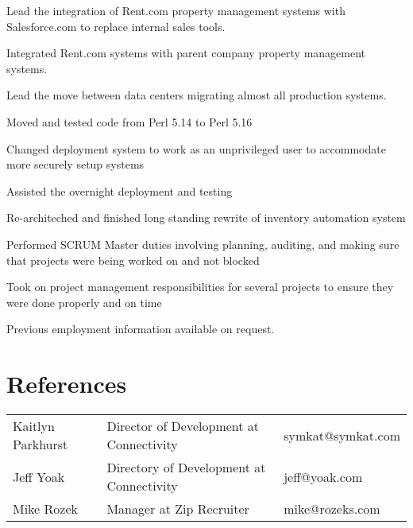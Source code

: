 \documentclass[table,tmargin=1in,bmargin=1in,letterpaper]{resume}
\begin{document}
\begin{compactitem}
\item Lead the integration of Rent.com property management systems with Salesforce.com to replace internal sales tools.
\item Integrated Rent.com systems with parent company property management systems.
\item Lead the move between data centers migrating almost all production systems.
  \begin{compactitem}
  \item Moved and tested code from Perl 5.14 to Perl 5.16
  \item Changed deployment system to work as an unprivileged user to accommodate more securely setup systems
  \item Assisted the overnight deployment and testing
  \end{compactitem}
\item Re-architeched and finished long standing rewrite of inventory automation system
\item Performed SCRUM Master duties involving planning, auditing, and making sure that projects were being worked on and not blocked
\item Took on project management responsibilities for several projects to ensure they were done properly and on time
\end{compactitem}

Previous employment information available on request.


\section{References}
\begin{tabular}{lll}
\rowcolor{white} Kaitlyn Parkhurst & Director of Development at Connectivity & symkat@symkat.com \\
\rowcolor{lightgray} Jeff Yoak & Directory of Development at Connectivity & jeff@yoak.com \\
\rowcolor{white} Mike Rozek & Manager at Zip Recruiter & mike@rozeks.com
\end{tabular}
\end{document}
